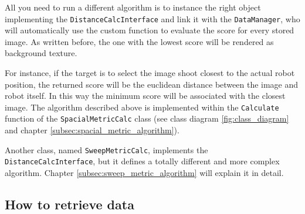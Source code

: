 %
All you need to run a different algorithm is to instance the right object implementing the
\texttt{DistanceCalcInterface} and link it with the \texttt{DataManager}, who will automatically
use the custom function to evaluate the score for every stored image. As written before, the
one with the lowest score will be rendered as background texture.
%

%
For instance, if the target is to select the image shoot closest to the actual robot position,
the returned score will be the euclidean distance between the image and robot itself. In this way
the minimum score will be associated with the closest image.
The algorithm described above is implemented within the \texttt{Calculate} function of the
\texttt{SpacialMetricCalc} class (see class diagram \ref{fig:class_diagram} and chapter
\ref{subsec:spacial_metric_algorithm}).
%

%
Another class, named \texttt{SweepMetricCalc}, implements the
\newline
\texttt{DistanceCalcInterface}, but it defines a totally different and more complex algorithm.
Chapter \ref{subsec:sweep_metric_algorithm} will explain it in detail.

\subsection{How to retrieve data}
\label{sub:howretrievedata}
